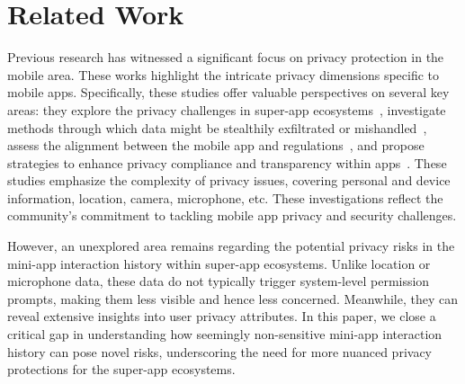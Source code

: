 \section{Related Work}
Previous research has witnessed a significant focus on privacy protection in the mobile area. 
These works highlight the intricate privacy dimensions specific to mobile apps. Specifically, these studies offer valuable perspectives on several key areas: they explore the privacy challenges in super-app ecosystems~\cite{dongexploring, 10.1145/3576915.3616676, 10.1145/3576915.3616591, 10.5555/3620237.3620608, yang2022cross, zhang2022identity, haney2021s, chen2019demystifying}, investigate methods through which data might be stealthily exfiltrated or mishandled~\cite{nan2023are, koch2023ok,diamantaris2021sneaky}, assess the alignment between the mobile app and regulations~\cite{pantrap, khandelwal2023unpacking, 10.1145/3576915.3623067, xiao2023lalaine, meng2023post, li2022collect, yang2022cross, young2022skilldetective, balash2022security, bui2021consistency, nguyen2021share, zuo2019does}, and propose strategies to enhance privacy compliance and transparency within apps~\cite{klein2023general,ferreira2023rulekeeper,jordan2021viceroy,nguyen2022freely,wang2022srr,cai2024famos}.
% 
These studies emphasize the complexity of privacy issues, covering personal and device information, location, camera, microphone, etc. These investigations reflect the community's commitment to tackling mobile app privacy and security challenges. %


However, an unexplored area remains regarding the potential privacy risks in the mini-app interaction history within super-app ecosystems. Unlike location or microphone data, these data do not typically trigger system-level permission prompts, making them less visible and hence less concerned. Meanwhile, they can reveal extensive insights into user privacy attributes. In this paper, we close a critical gap in understanding how seemingly non-sensitive mini-app interaction history can pose novel risks, underscoring the need for more nuanced privacy protections for the super-app ecosystems.
